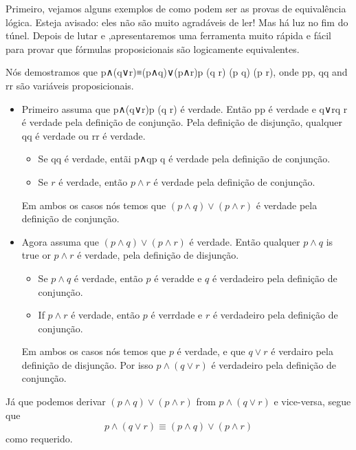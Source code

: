 Primeiro, vejamos alguns exemplos de como podem ser as provas de equivalência lógica. Esteja avisado: eles não são muito agradáveis ​​de ler! Mas há luz no fim do túnel. Depois de lutar  e ,apresentaremos uma ferramenta muito rápida e fácil para provar que fórmulas proposicionais são logicamente equivalentes.
\begin{example}
\label{exConjunctionDistributesOverDisjunction}
Nós demostramos que p∧(q∨r)≡(p∧q)∨(p∧r)p \wedge (q \vee r) \equiv (p \wedge q) \vee (p \wedge r), onde pp, qq and rr são variáveis proposicionais.

\begin{itemize}
\item Primeiro assuma que p∧(q∨r)p \wedge (q \vee r) é verdade. Então pp é verdade e q∨rq \vee r é verdade pela definição de conjunção. Pela definição de disjunção, qualquer qq é verdade ou rr é verdade.
\begin{itemize}
\item Se qq é verdade, entãi p∧qp \wedge q é verdade pela definição de conjunção.
\item Se $r$ é verdade, então $p \wedge r$ é verdade pela definição de conjunção.
\end{itemize}
Em ambos os casos nós temos que $(p \wedge q) \vee (p \wedge r)$ é verdade pela definição de conjunção.

\item Agora assuma que $(p \wedge q) \vee (p \wedge r)$ é verdade. Então qualquer $p \wedge q$ is true or $p \wedge r$ é verdade, pela definição de disjunção.
\begin{itemize}
\item Se $p \wedge q$ é verdade, então $p$ é veradde e $q$ é verdadeiro pela definição de conjunção.
\item If $p \wedge r$ é verdade, então $p$ é verrdade e $r$ é verdadeiro pela definição de conjunção.
\end{itemize}
Em ambos os casos nós temos que $p$ é verdade, e que $q \vee r$ é verdairo pela definição de disjunção. Por isso $p \wedge (q \vee r)$ é verdadeiro pela definição de conjunção.
\end{itemize}

Já que podemos derivar $(p \wedge q) \vee (p \wedge r)$ from $p \wedge (q \vee r)$ e vice-versa, segue que
\[ p \wedge (q \vee r) \equiv (p \wedge q) \vee (p \wedge r)\]
como requerido.
\end{example}

